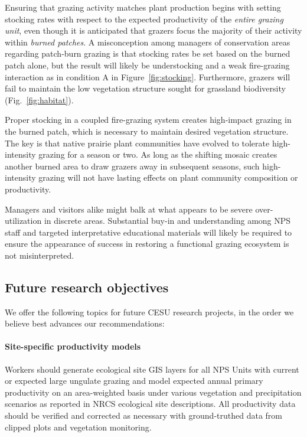 Ensuring that grazing activity matches plant production begins with setting stocking rates with respect to the expected productivity of the \emph{entire grazing unit}, even though it is anticipated that grazers focus the majority of their activity within \emph{burned patches}. 
A misconception among managers of conservation areas regarding patch-burn grazing is that stocking rates be set based on the burned patch alone, but the result will likely be understocking and a weak fire-grazing interaction as in condition A in Figure~\ref{fig:stocking}. 
Furthermore, grazers will fail to maintain the low vegetation structure sought for grassland biodiversity (Fig.~\ref{fig:habitat}).

Proper stocking in a coupled fire-grazing system creates high-impact grazing in the burned patch, which is necessary to maintain desired vegetation structure.
The key is that native prairie plant communities have evolved to tolerate high-intensity grazing for a season or two. 
As long as the shifting mosaic creates another burned area to draw grazers away in subsequent seasons, such high-intensity grazing will not have lasting effects on plant community composition or productivity. 

Managers and visitors alike might balk at what appears to be severe over-utilization in discrete areas. 
Substantial buy-in and understanding among NPS staff and targeted interpretative educational materials will likely be required to ensure the appearance of success in restoring a functional grazing ecosystem is not misinterpreted. 

\subsection{Future research objectives}

We offer the following topics for future CESU research projects, in the order we believe best advances our recommendations: 

\paragraph{Site-specific productivity models} 

Workers should generate ecological site GIS layers for all NPS Units with current or expected large ungulate grazing and model expected annual primary productivity on an area-weighted basis under various vegetation and precipitation scenarios as reported in NRCS ecological site descriptions. 
All productivity data should be verified and corrected as necessary with ground-truthed data from clipped plots and  vegetation monitoring. 

